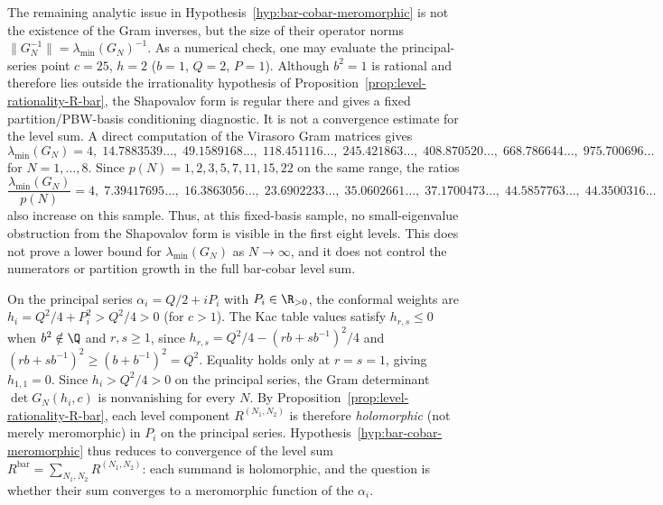 \begin{remark}
\label{rmk:shapovalov-eigenvalue-asymptotics}
The remaining analytic issue in
Hypothesis~\ref{hyp:bar-cobar-meromorphic} is not the existence of
the Gram inverses, but the size of their operator norms
$\|G_N^{-1}\| = \lambda_{\min}(G_N)^{-1}$. As a numerical check, one
may evaluate the principal-series point $c=25$, $h=2$
($b=1$, $Q=2$, $P=1$). Although $b^2=1$ is rational and therefore
lies outside the irrationality hypothesis of
Proposition~\ref{prop:level-rationality-R-bar}, the Shapovalov form is
regular there and gives a fixed partition/PBW-basis conditioning
diagnostic. It is not a convergence estimate for the level sum. A
direct computation of the Virasoro Gram matrices gives
\[
\lambda_{\min}(G_N)
=
4,\; 14.7883539\ldots,\; 49.1589168\ldots,\; 118.451116\ldots,\;
245.421863\ldots,\; 408.870520\ldots,\; 668.786644\ldots,\;
975.700696\ldots
\]
for $N=1,\ldots,8$. Since
$p(N)=1,2,3,5,7,11,15,22$ on the same range, the ratios
\[
\frac{\lambda_{\min}(G_N)}{p(N)}
=
4,\; 7.39417695\ldots,\; 16.3863056\ldots,\; 23.6902233\ldots,\;
35.0602661\ldots,\; 37.1700473\ldots,\; 44.5857763\ldots,\;
44.3500316\ldots
\]
also increase on this sample. Thus, at this fixed-basis sample, no
small-eigenvalue obstruction from the Shapovalov form is visible in the
first eight levels. This does not prove a lower bound for
$\lambda_{\min}(G_N)$ as $N \to \infty$, and it does not control the
numerators or partition growth in the full bar-cobar level sum.
\end{remark}

\begin{remark}
\label{rem:principal-series-holomorphic}
On the principal series $\alpha_i = Q/2 + iP_i$ with
$P_i \in \R_{>0}$, the conformal weights are
$h_i = Q^2/4 + P_i^2 > Q^2/4 > 0$
(for $c > 1$). The Kac table values satisfy
$h_{r,s} \le 0$ when $b^2 \notin \Q$ and
$r,s \ge 1$, since
$h_{r,s} = Q^2/4 - (rb + sb^{-1})^2/4$
and $(rb + sb^{-1})^2 \ge (b + b^{-1})^2 = Q^2$.
Equality holds only at $r = s = 1$, giving $h_{1,1} = 0$.
Since $h_i > Q^2/4 > 0$ on the principal series, the Gram
determinant $\det G_N(h_i, c)$ is nonvanishing for every
$N$. By Proposition~\ref{prop:level-rationality-R-bar}, each
level component $R^{(N_1,N_2)}$ is therefore
\emph{holomorphic} (not merely meromorphic) in $P_i$ on
the principal series.
Hypothesis~\ref{hyp:bar-cobar-meromorphic} thus reduces to
convergence of the level sum
$R^{\mathrm{bar}} = \sum_{N_1, N_2}
R^{(N_1, N_2)}$:
each summand is holomorphic, and the question is whether
their sum converges to a meromorphic function of the
$\alpha_i$.
\end{remark}


